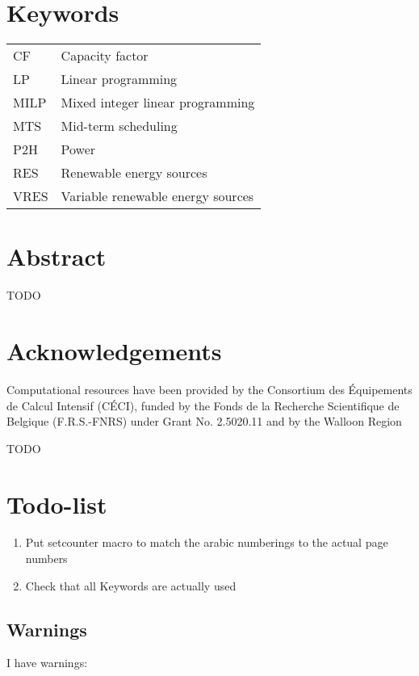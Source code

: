 \section*{Keywords}

\begin{table}[h!]
    \begin{tabular}{p{3cm} p{8cm}}
        CF & Capacity factor \\
        LP & Linear programming \\
        MILP & Mixed integer linear programming \\
        MTS & Mid-term scheduling \\
        P2H & Power \\
        RES & Renewable energy sources \\
        VRES & Variable renewable energy sources \\
    \end{tabular}
\end{table}

\newpage

\section*{Abstract}

TODO


\section*{Acknowledgements}

Computational resources have been provided by the Consortium des Équipements de Calcul Intensif (CÉCI), funded by the Fonds de la Recherche Scientifique de Belgique (F.R.S.-FNRS) under Grant No. 2.5020.11 and by the Walloon Region

TODO

\section*{Todo-list}
\begin{enumerate}
    \item Put setcounter macro to match the arabic numberings to the actual page numbers
    \item Check that all Keywords are actually used
\end{enumerate}

\newpage

\tableofcontents

\subsection*{Warnings}

I have  warnings:
\begin{itemize}
    \mylistwarnings{\item}
\end{itemize}

\newpage